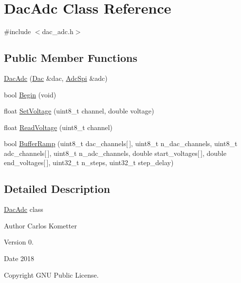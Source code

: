 \hypertarget{classDacAdc}{}\section{Dac\+Adc Class Reference}
\label{classDacAdc}


{\ttfamily \#include $<$dac\+\_\+adc.\+h$>$}

\subsection*{Public Member Functions}
\begin{DoxyCompactItemize}
\item 
\mbox{\hyperlink{classDacAdc_afb5c669fd66e4ff549506a58af0916e1}{Dac\+Adc}} (\mbox{\hyperlink{classDac}{Dac}} \&dac, \mbox{\hyperlink{classAdcSpi}{Adc\+Spi}} \&adc)
\item 
bool \mbox{\hyperlink{classDacAdc_adc136f0dd9872a8f10b908891a4f604b}{Begin}} (void)
\item 
float \mbox{\hyperlink{classDacAdc_a2c307a0ecebbdc35e8f365d80eb8a40a}{Set\+Voltage}} (uint8\+\_\+t channel, double voltage)
\item 
float \mbox{\hyperlink{classDacAdc_a98e135e1946f5fd899305b52a97f5e53}{Read\+Voltage}} (uint8\+\_\+t channel)
\item 
bool \mbox{\hyperlink{classDacAdc_a9a6705b1fa5ecc977ef08a9189d3bf87}{Buffer\+Ramp}} (uint8\+\_\+t dac\+\_\+channels\mbox{[}$\,$\mbox{]}, uint8\+\_\+t n\+\_\+dac\+\_\+channels, uint8\+\_\+t adc\+\_\+channels\mbox{[}$\,$\mbox{]}, uint8\+\_\+t n\+\_\+adc\+\_\+channels, double start\+\_\+voltages\mbox{[}$\,$\mbox{]}, double end\+\_\+voltages\mbox{[}$\,$\mbox{]}, uint32\+\_\+t n\+\_\+steps, uint32\+\_\+t step\+\_\+delay)
\end{DoxyCompactItemize}


\subsection{Detailed Description}
\mbox{\hyperlink{classDacAdc}{Dac\+Adc}} class \begin{DoxyAuthor}{Author}
Carlos Kometter 
\end{DoxyAuthor}
\begin{DoxyVersion}{Version}
0. 
\end{DoxyVersion}
\begin{DoxyDate}{Date}
2018 
\end{DoxyDate}
\begin{DoxyCopyright}{Copyright}
G\+NU Public License. 
\end{DoxyCopyright}


